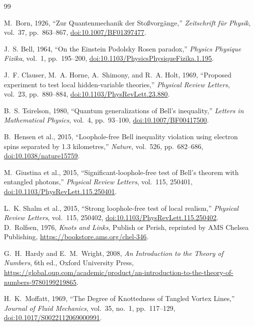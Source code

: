 \documentclass[11pt]{article}
\begin{document}
\begin{thebibliography}{99}

M.~Born,
1926,
``Zur Quantenmechanik der Sto{\ss}vorg{\"a}nge,''
\emph{Zeitschrift f{\"u}r Physik}, vol.~37, pp.~863--867,
\href{https://doi.org/10.1007/BF01397477}{doi:10.1007/BF01397477}.

J.~S. Bell,
1964,
``On the Einstein Podolsky Rosen paradox,''
\emph{Physics Physique Fizika}, vol.~1, pp.~195--200,
\href{https://doi.org/10.1103/PhysicsPhysiqueFizika.1.195}{doi:10.1103/PhysicsPhysiqueFizika.1.195}.

J.~F. Clauser, M.~A. Horne, A.~Shimony, and R.~A. Holt,
1969,
``Proposed experiment to test local hidden-variable theories,''
\emph{Physical Review Letters}, vol.~23, pp.~880--884,
\href{https://doi.org/10.1103/PhysRevLett.23.880}{doi:10.1103/PhysRevLett.23.880}.

B.~S. Tsirelson,
1980,
``Quantum generalizations of Bell's inequality,''
\emph{Letters in Mathematical Physics}, vol.~4, pp.~93--100,
\href{https://doi.org/10.1007/BF00417500}{doi:10.1007/BF00417500}.

B.~Hensen et al.,
2015,
``Loophole-free Bell inequality violation using electron spins separated by 1.3 kilometres,''
\emph{Nature}, vol.~526, pp.~682--686,
\href{https://doi.org/10.1038/nature15759}{doi:10.1038/nature15759}.

M.~Giustina et al.,
2015,
``Significant-loophole-free test of Bell's theorem with entangled photons,''
\emph{Physical Review Letters}, vol.~115, 250401,
\href{https://doi.org/10.1103/PhysRevLett.115.250401}{doi:10.1103/PhysRevLett.115.250401}.

L.~K. Shalm et al.,
2015,
``Strong loophole-free test of local realism,''
\emph{Physical Review Letters}, vol.~115, 250402,
\href{https://doi.org/10.1103/PhysRevLett.115.250402}{doi:10.1103/PhysRevLett.115.250402}.
D.~Rolfsen,
1976,
\emph{Knots and Links},
Publish or Perish,
reprinted by AMS Chelsea Publishing,
\url{https://bookstore.ams.org/chel-346}.

G.~H.~Hardy and E.~M.~Wright,
2008,
\emph{An Introduction to the Theory of Numbers},
6th ed., Oxford University Press,
\url{https://global.oup.com/academic/product/an-introduction-to-the-theory-of-numbers-9780199219865}.

H.~K.~Moffatt,
1969,
``The Degree of Knottedness of Tangled Vortex Lines,''
\emph{Journal of Fluid Mechanics}, vol.~35, no.~1, pp.~117--129,
\href{https://doi.org/10.1017/S0022112069000991}{doi:10.1017/S0022112069000991}.

\end{thebibliography}
\end{document}
